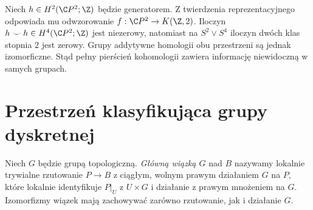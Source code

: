 \begin{przyklad}
Niech $h\in H^2(\C P^2;\Z)$ będzie generatorem.
Z twierdzenia reprezentacyjnego odpowiada mu odwzorowanie
$f:\C P^2\to K(\Z,2)$. Iloczyn
$h\smile h\in H^4(\C P^2;\Z)$ jest niezerowy,
natomiast na $S^2\vee S^4$ iloczyn dwóch klas
stopnia $2$ jest zerowy. Grupy addytywne homologii
obu przestrzeni są jednak izomorficzne. Stąd pełny
pierścień kohomologii zawiera informację niewidoczną
w samych grupach.
\end{przyklad}

\section{Przestrzeń klasyfikująca grupy dyskretnej}
\begin{definicja}
Niech $G$ będzie grupą topologiczną. \emph{Główną
wiązką $G$} nad $B$ nazywamy lokalnie trywialne
rzutowanie $P\to B$ z ciągłym, wolnym prawym działaniem
$G$ na $P$, które lokalnie identyfikuje $P|_U$
z $U\times G$ i działanie z prawym mnożeniem na $G$.
Izomorfizmy wiązek mają zachowywać zarówno rzutowanie,
jak i działanie $G$.
\end{definicja}

